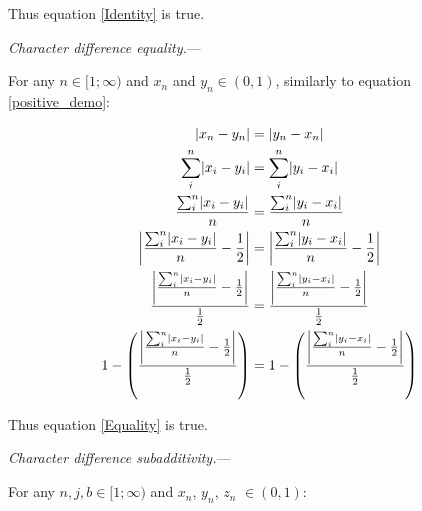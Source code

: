 \documentclass[12pt,letterpaper]{article}
\DeclarePairedDelimiter\abs{\lvert}{\rvert}%
\renewcommand{\subsection}[1]{%
\bigskip
\begin{center}
\begin{large}
\normalfont\itshape #1
\end{large}
\end{center}}
\renewcommand{\subsection}[1]{%
\vspace{2ex}
\noindent
\textit{#1.}---}
\begin{document}
Thus equation \ref{Identity} is true.

\subsection{Character difference equality}

For any $n \in [1;\infty)$ and $x_{n}$ and $y_{n} \in (0,1)$, similarly to equation \ref{positive_demo}:

\begin{equation}
    \label{equality_demo}
    \begin{aligned}
    \abs{x_{n}-y_{n}} &= \abs{y_{n}-x_{n}}\\
    \sum_{i}^{n}\abs{x_{i}-y_{i}} &= \sum_{i}^{n}\abs{y_{i}-x_{i}}\\
    \frac{\sum_{i}^{n}\abs{x_{i}-y_{i}}}{n} &= \frac{\sum_{i}^{n}\abs{y_{i}-x_{i}}}{n}\\
    \abs*{\frac{\sum_{i}^{n}\abs{x_{i}-y_{i}}}{n}-\frac{1}{2}} &= \abs*{\frac{\sum_{i}^{n}\abs{y_{i}-x_{i}}}{n}-\frac{1}{2}}\\
    \frac{\abs*{\frac{\sum_{i}^{n}\abs{x_{i}-y_{i}}}{n}-\frac{1}{2}}}{\frac{1}{2}} &= \frac{\abs*{\frac{\sum_{i}^{n}\abs{y_{i}-x_{i}}}{n}-\frac{1}{2}}}{\frac{1}{2}}\\
    1 - \left(\frac{\abs*{\frac{\sum_{i}^{n}\abs{x_{i}-y_{i}}}{n}-\frac{1}{2}}}{\frac{1}{2}}\right) &= 1 - \left(\frac{\abs*{\frac{\sum_{i}^{n}\abs{y_{i}-x_{i}}}{n}-\frac{1}{2}}}{\frac{1}{2}}\right)\\
    \end{aligned}
\end{equation}

Thus equation \ref{Equality} is true.

\subsection{Character difference subadditivity}

For any $n, j, b \in [1;\infty)$ and $x_{n}$, $y_{n}$, $z_{n}$ $\in (0,1)$:
\end{document}
